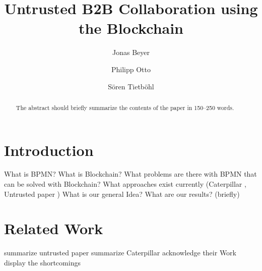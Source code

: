 \documentclass[runningheads]{llncs}
\begin{document}
%
\title{Untrusted B2B Collaboration using the Blockchain}
%
%
\author{Jonas Beyer \and
Philipp Otto\and
S\"oren Tietb\"ohl}
%
%
%
\maketitle              %
%
\begin{abstract}
The abstract should briefly summarize the contents of the paper in
150--250 words.

\end{abstract}
%
%
%
\section{Introduction}





What is BPMN?
What is Blockchain?
What problems are there with BPMN that can be solved with Blockchain?
What approaches exist currently (Caterpillar \cite{lopez2017caterpillar}, Untrusted paper \cite{weber2016untrusted})
What is our general Idea?
What are our results? (briefly)


\section{Related Work}

summarize untrusted paper
summarize Caterpillar
acknowledge their Work
display the shortcomings
\end{document}
